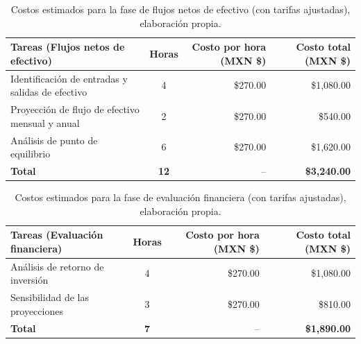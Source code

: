\begin{table}[H]
	\centering
	\renewcommand{\arraystretch}{1.6}
	\setlength{\tabcolsep}{10pt}
	\Huge
	\begin{adjustbox}{max width=\textwidth}
		\begin{tabular}{|p{9.5cm}|c|r|r|}
			\hline
			\textbf{Tareas (Flujos netos de efectivo)} & \textbf{Horas} & \textbf{Costo por hora (MXN \$)} & \textbf{Costo total (MXN \$)} \\ \hline
			Identificación de entradas y salidas de efectivo & 4 & \$270.00 & \$1,080.00 \\ \hline
			Proyección de flujo de efectivo mensual y anual & 2 & \$270.00 & \$540.00 \\ \hline
			Análisis de punto de equilibrio & 6 & \$270.00 & \$1,620.00 \\ \hline
			\textbf{Total} & \textbf{12} & -- & \textbf{\$3,240.00} \\ \hline
		\end{tabular}
	\end{adjustbox}
	\caption[Costos estimados para la fase de flujos netos de efectivo (con tarifas ajustadas)]{Costos estimados para la fase de flujos netos de efectivo (con tarifas ajustadas), elaboración propia.} 
	\label{tab:costos_flujos_efectivo}
\end{table}

\begin{table}[H]
	\centering
	\renewcommand{\arraystretch}{1.6}
	\setlength{\tabcolsep}{10pt}
	\Huge
	\begin{adjustbox}{max width=\textwidth}
		\begin{tabular}{|p{9.5cm}|c|r|r|}
			\hline
			\textbf{Tareas (Evaluación financiera)} & \textbf{Horas} & \textbf{Costo por hora (MXN \$)} & \textbf{Costo total (MXN \$)} \\ \hline
			Análisis de retorno de inversión & 4 & \$270.00 & \$1,080.00 \\ \hline
			Sensibilidad de las proyecciones & 3 & \$270.00 & \$810.00 \\ \hline
			\textbf{Total} & \textbf{7} & -- & \textbf{\$1,890.00} \\ \hline
		\end{tabular}
	\end{adjustbox}
	\caption[Costos estimados para la fase de evaluación financiera (con tarifas ajustadas)]{Costos estimados para la fase de evaluación financiera (con tarifas ajustadas), elaboración propia.} 
	\label{tab:costos_evaluacion_financiera}
\end{table}


